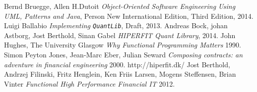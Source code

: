 \documentclass{article}
\newcommand{\QL}{\texttt{QuantLib}}
\begin{document}
\begin{thebibliography}{9}
    Bernd Bruegge, Allen H.Dutoit
    \emph{Object-Oriented Software Engineering Using UML, Patterns and Java},
    Person New International Edition,
    Third Edition,
    2014.
    Luigi Ballabio
    \emph{Implementing \QL},
    Draft,
    2013.
    Andreas Bock, johan Astborg, Jost Berthold, Sinan Gabel
    \emph{HIPERFIT Quant Library},
    2014.
    John Hughes, The University Glasgow
    \emph{Why Functional Programming Matters} 
    1990.
    Simon Peyton Jones, Jean-Marc Eber, Julian Seward
    \emph{Composing contracts: an adventure in financial engineering}
    2000.
    http://hiperfit.dk/
    Jost Berthold, Andrzej Filinski, Fritz Henglein, Ken Friis Larsen, Mogens Steffensen, Brian Vinter
    \emph{Functional High Performance Financial IT}
    2012.
\end{thebibliography}
\end{document}
